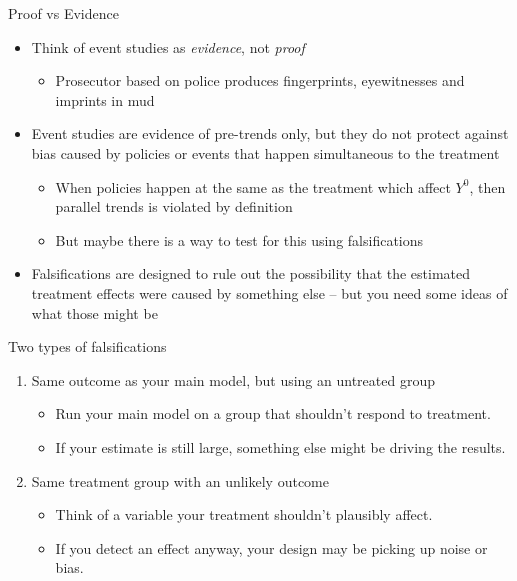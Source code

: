 \documentclass{beamer}
\begin{document}
\begin{frame}{Proof vs Evidence}

\begin{itemize}
\item Think of event studies as \emph{evidence}, not \emph{proof}
	\begin{itemize}
	\item Prosecutor based on police produces fingerprints, eyewitnesses and imprints in mud
	\end{itemize}
\item Event studies are evidence of pre-trends only, but they do not protect against bias caused by policies or events that happen simultaneous to the treatment
	\begin{itemize}
	\item When policies happen at the same as the treatment which affect $Y^0$, then parallel trends is violated by definition
	\item But maybe there is a way to test for this using falsifications
	\end{itemize}
\item Falsifications are designed to rule out the possibility that the estimated treatment effects were caused by something else -- but you need some ideas of what those might be
\end{itemize}
\end{frame}

\begin{frame}{Two types of falsifications}

\begin{enumerate}
\item Same outcome as your main model, but using an untreated group
	\begin{itemize}
	\item Run your main model on a group that shouldn’t respond to treatment.
	\item If your estimate is still large, something else might be driving the results.
	\end{itemize}
\item Same treatment group with an unlikely outcome
	\begin{itemize}
	\item Think of a variable your treatment shouldn’t plausibly affect.
	\item If you detect an effect anyway, your design may be picking up noise or bias.
	\end{itemize}
\end{enumerate}

\end{frame}
\end{document}
